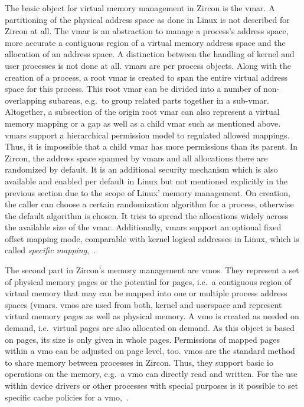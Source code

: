 The basic object for virtual memory management in Zircon is the \acl{vmar}.
A partitioning of the physical address space as done in Linux is not described for Zircon at all.
The \ac{vmar} is an abstraction to manage a process's address space, more accurate a contiguous region of a virtual memory address space and the allocation of an address space.
A distinction between the handling of kernel and user processes is not done at all.
\acp{vmar} are per process objects.
Along with the creation of a process, a root \ac{vmar} is created to span the entire virtual address space for this process.
This root \ac{vmar} can be divided into a number of non-overlapping subareas, e.g.\ to group related parts together in a sub-\ac{vmar}.
Altogether, a subsection of the origin root \ac{vmar} can also represent a virtual memory mapping or a gap as well as a child \ac{vmar} such as mentioned above.
\acp{vmar} support a hierarchical permission model to regulated allowed mappings.
Thus, it is impossible that a child \ac{vmar} has more permissions than its parent.
In Zircon, the address space spanned by \acp{vmar} and all allocations there are randomized by default.
It is an additional security mechanism which is also available and enabled per default in Linux but not mentioned explicitly in the previous section due to the scope of Linux' memory management.
On creation, the caller can choose a certain randomization algorithm for a process, otherwise the default algorithm is chosen.
It tries to spread the allocations widely across the available size of the \ac{vmar}.
Additionally, \acp{vmar} support an optional fixed offset mapping mode, comparable with kernel logical addresses in Linux, which is called \textit{specific mapping}\cite{zircon-concepts},~\cite{zircon-vmar}.

The second part in Zircon's memory management are \acfp{vmo}.
They represent a set of physical memory pages or the potential for pages, i.e.\ a contiguous region of virtual memory that may can be mapped into one or multiple process address spaces (\acp{vmar}.
\acp{vmo} are used from both, kernel and userspace and represent virtual memory pages as well as physical memory.
A \ac{vmo} is created as needed on demand, i.e.\ virtual pages are also allocated on demand.
As this object is based on pages, its size is only given in whole pages.
Permissions of mapped pages within a \ac{vmo} can be adjusted on page level, too.
\acp{vmo} are the standard method to share memory between processes in Zircon.
Thus, they support basic \ac{io} operations on the memory, e.g.\ a \ac{vmo} can directly read and written.
For the use within device drivers or other processes with special purposes is it possible to set specific cache policies for a \ac{vmo}\cite{zircon-concepts},~\cite{zircon-vmo}.



